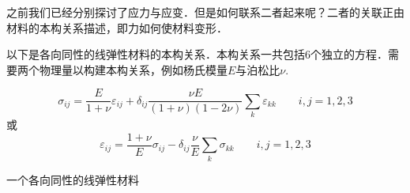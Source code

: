 
\begin{issues}
\issueDraft
\end{issues}

之前我们已经分别探讨了应力与应变．但是如何联系二者起来呢？二者的关联正由材料的本构关系描述，即力如何使材料变形．

以下是各向同性的线弹性材料的本构关系．本构关系一共包括$6$个独立的方程．需要两个物理量以构建本构关系，例如杨氏模量$E$与泊松比$\nu$.

\begin{equation}
\sigma_{ij}=\frac{E}{1+\nu}\varepsilon_{ij}+\delta_{ij}\frac{\nu E}{(1+\nu)(1-2\nu)}\sum_k\varepsilon_{kk}\qquad i,j=1,2,3
\end{equation}
或
\begin{equation}
\varepsilon_{ij}=\frac{1+\nu}{E}\sigma_{ij}-\delta_{ij}\frac{\nu}{E}\sum_k\sigma_{kk} \qquad i,j=1,2,3
\end{equation}

一个各向同性的线弹性材料

